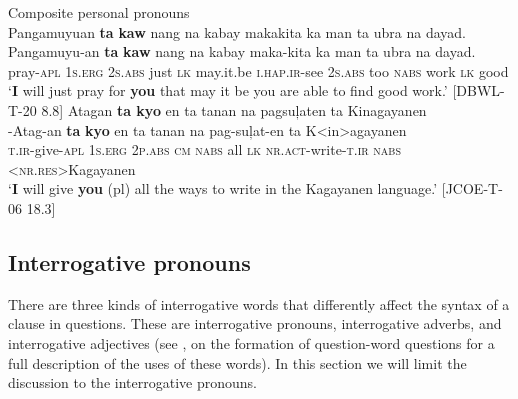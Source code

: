 \ea
\label{bkm:Ref419448603}
Composite personal pronouns \\
Pangamuyuan  \textbf{ta} \textbf{kaw}  nang  na  kabay makakita  ka   man  ta  ubra  na  dayad. \\\smallskip
 \gll Pangamuyu-an  \textbf{ta} \textbf{kaw}  nang  na  kabay maka-kita  ka   man  ta  ubra  na  dayad. \\
pray\textsc{-apl}  1\textsc{s.erg} 2\textsc{s.abs}  just  \textsc{lk}  may.it.be
\textsc{i.hap.ir}-see  2\textsc{s.abs}  too  \textsc{nabs}  work  \textsc{lk}  good \\
\glt `\textbf{I} will just pray for \textbf{you} that may it be you are able to find good work.’ [DBWL-T-20 8.8]
\z
\ea
\label{bkm:Ref419448605}
Atagan \textbf{ta kyo}  en  ta  tanan  na  pagsuļaten ta  Kinagayanen \\\smallskip
 \gll \emptyset{}-Atag-an  \textbf{ta} \textbf{kyo}  en  ta  tanan  na  pag-suļat-en\footnotemark{} ta  K<in>agayanen\footnotemark{} \\
\textsc{t.ir-}give-\textsc{apl}  1\textsc{s.erg} 2\textsc{p.abs}  \textsc{cm}  \textsc{nabs} all \textsc{lk}  \textsc{nr.act}-write\textsc{-t.ir}
\textsc{nabs}  <\textsc{nr.res}>Kagayanen \\
\glt `\textbf{I} will give \textbf{you} (pl) all the ways to write in the Kagayanen language.’ [JCOE-T-06 18.3]
\z

\subsection{Interrogative pronouns}
\label{sec:interrogativepronouns}
There are three kinds of interrogative words that differently affect the syntax of a clause in questions. These are interrogative pronouns, interrogative adverbs, and interrogative adjectives (see ,  on the formation of question-word questions for a full description of the uses of these words). In this section we will limit the discussion to the interrogative pronouns.

